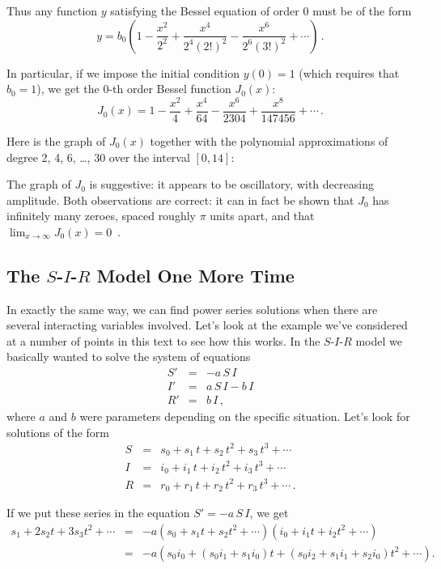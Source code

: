 {{{{Thus any function $y$ satisfying the Bessel equation of order 0 must be of the form
\[
y=b_0\left(1-\frac{x^2}{2^2}+\frac{x^4}{2^4(2!)^2} -\frac{x^6}{2^6(3!)^2} +\cdots \right) \, .
\]

In particular, if we impose the initial condition $y(0)=1$ (which requires that $b_0=1$), we get the 0-th order Bessel function $J_0(x)$:
\[
J_0(x)=1-\frac{x^2}{4}+\frac{x^4}{64} -\frac{x^6}{2304} +\frac{x^8}{147456}+\cdots  \, .
\]

Here is the graph of $J_0(x)$ together with the 
polynomial approximations of degree 2, 4, 6, \ldots , 30 over the interval $[0,14]$:

\vspace*{3in}

The graph of $J_0$ is suggestive:  it appears to be oscillatory, with decreasing amplitude. Both observations are correct: it can in fact be shown that $J_0$ has infinitely many zeroes, spaced roughly $\pi$ units apart, and that $\lim_{x \to\infty} J_0(x) = 0$ \,.

\subsection{The $S$-$I$-$R$ Model One More Time}

In exactly the same way, we can find power series solutions when there are several interacting variables involved. Let's look at the example we've considered at a number of points in this text to see how this works.  In the $S$-$I$-$R$ model we basically wanted 
to solve the system of equations
\begin{eqnarray*}
S'&=& -a\, S\, I \\
I'&=& a\, S\, I - b\, I \\
R'&=& b\, I \, ,
\end{eqnarray*}
where $a$ and $b$ were parameters depending on the specific situation.  Let's look for solutions of the form
\begin{eqnarray*}
S&=&s_0 + s_1\,t + s_2\,t^2 + s_3\,t^3 + \cdots \\
I&=&i_0 + i_1\,t + i_2\,t^2 + i_3\,t^3 + \cdots \\
R&=&r_0 + r_1\,t + r_2\,t^2 + r_3\,t^3 + \cdots \, .
\end{eqnarray*}

If we put these series in the equation $S'= -a\, S\, I$, we get
\begin{eqnarray*}
s_1 + 2s_2t + 3s_3t^2 + \cdots&=&-a(s_0 + s_1t + s_2t^2 + \cdots)(i_0 + i_1t + i_2t^2 + \cdots) \\
&=&-a(s_0i_0 + (s_0i_1+s_1i_0)t+(s_0i_2+s_1i_1+s_2i_0)t^2 + \cdots ).
\end{eqnarray*}

}}}}
